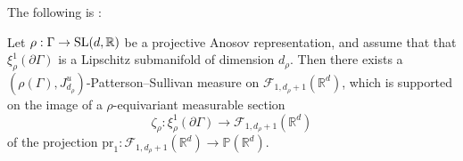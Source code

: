 \documentclass{report}
\begin{document}
The following is \cite[Proposition 6.4]{pozzetti_anosov_2023}:
\begin{proposition}\label{prop:PSMeasureExists}
    Let $\rho: \Gamma \to \operatorname{{\mathrm{SL}}}(d, \mathbb R)$ be a projective Anosov representation, and assume that that $\xi^1_\rho(\partial \Gamma)$ is a Lipschitz submanifold of dimension $d_\rho$.
    Then there exists a $(\rho(\Gamma), J_{d_\rho}^u)$-Patterson--Sullivan measure on $\mathcal F_{1,d_\rho + 1}(\mathbb R^d)$, which is supported on the image of a $\rho$-equivariant measurable section
    \[
    \zeta_\rho: \xi_\rho^1(\partial \Gamma) \to \mathcal F_{1, d_\rho + 1}(\mathbb R^d)
    \]
    of the projection $\mathrm{pr}_1: \mathcal F_{1, d_\rho + 1}(\mathbb R^d) \to \mathbb P(\mathbb R^d)$.
\end{proposition}
\end{document}
